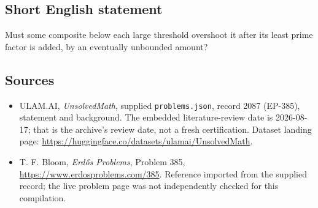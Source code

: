 \documentclass[11pt,a4paper]{article}
\begin{document}
\subsection{Short English statement}

Must some composite below each large threshold overshoot it after its least prime factor is added, by an eventually unbounded amount?

\subsection{Sources}

{\small

\begin{itemize}

\item[\hypertarget{source:2087:1}{S1}] ULAM.AI, \emph{UnsolvedMath}, supplied \texttt{problems.json}, record 2087 (EP-385), statement and background. The embedded literature-review date is 2026-08-17; that is the archive’s review date, not a fresh certification. Dataset landing page: \url{https://huggingface.co/datasets/ulamai/UnsolvedMath}.

\item[\hypertarget{source:2087:2}{S2}] T. F. Bloom, \emph{Erdős Problems}, Problem 385, \url{https://www.erdosproblems.com/385}. Reference imported from the supplied record; the live problem page was not independently checked for this compilation.

\end{itemize}

}

\label{end:2087}
\end{document}
